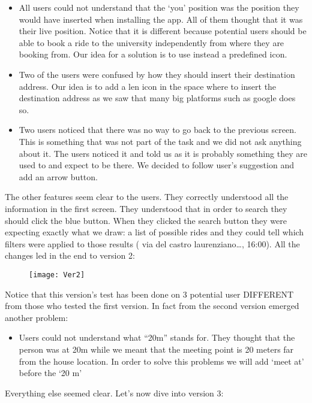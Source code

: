 \documentclass{article}
\begin{document}
\begin{itemize}
    \item All users could not understand that the ‘you’ position was the position they would have inserted when installing the app. All of them thought that it was their live position. Notice that it is different because potential users should be able to book a ride to the university independently from where they are booking from. Our idea for a solution is to use instead a predefined icon.
    \item Two of the users were confused by how they should insert their destination address.
     Our idea is to add a len icon in the space where to insert the destination address as we saw that many big platforms such as google does so.
     \item Two users noticed that there was no way to go back to the previous screen. This is something that was not part of the task and we did not ask anything about it. The  users noticed it and told us as it is probably something they are used to and expect to be there.
     We decided to follow user’s suggestion and add an arrow button.
\end{itemize}
The other features seem clear to the users. They correctly understood all the information in the first screen. They understood that in order to search they should click the blue button. When they clicked the search button they were expecting exactly what we draw: a list of possible rides and they could tell which filters were applied to those results ( via del castro laurenziano…, 16:00). All the changes led in the end to version 2: 

\begin{figure}
    \centering
     \texttt{[image: Ver2]}
\end{figure}

Notice that this version’s test has been done on 3 potential user DIFFERENT from those who tested the first version. In fact from the second version emerged another problem:

\begin{itemize}
    \item Users could not understand what “20m” stands for. They thought that the person was at 20m while we meant that the meeting point is 20 meters far from the house location. In order to solve this problems we will add ‘meet at’ before the ‘20 m’
\end{itemize}

Everything else seemed clear. Let's now dive into version 3: 
\newpage
\end{document}
